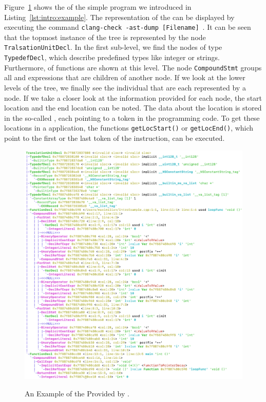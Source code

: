 Figure~\ref{fig:intro:dump ast example} shows the \astsmall of the simple \CPP program we introduced in Listing~\ref{lst:intro:example}. The representation of the \astsmall can be displayed by executing the command \lstinline{clang-check -ast-dump [Filename]}~\cite{ClangCheck}. It can be seen that the topmost instance of the tree is represented by the node \lstinline{TralsationUnitDecl}. In the first sub-level, we find the nodes of type \lstinline{TypedefDecl}, which describe predefined types like integer or strings. Furthermore, \declssmall of functions are shown at this level. The node \lstinline{CompoundStmt} groups all \STATS and expressions that are children of another node. If we look at the lower levels of the tree, we finally see the individual \STATS that are each represented by a node. If we take a closer look at the information provided for each node, the start location and the end location can be noted. The data about the location is stored in the so-called \SOUMNG, each pointing to a token in the programming code. To get these locations in a \CLANG application, the functions \lstinline{getLocStart()} or \lstinline{getLocEnd()}, which point to the first or the last token of the instruction, can be executed. 

\begin{figure}[t]
  \centering
  \caption{An Example of the \AST Provided by \CLANG.} 
  \includegraphics[width=1\textwidth]{graphics/t_ast.png}
  \label{fig:intro:dump ast example}
\end{figure}

